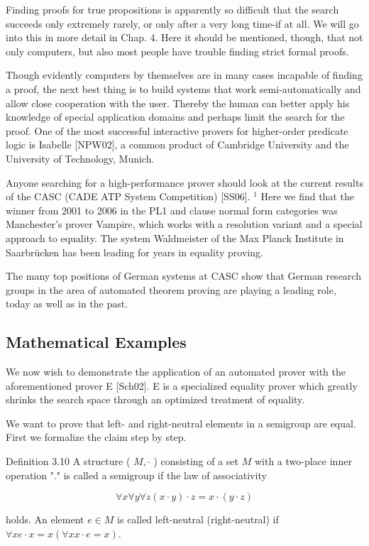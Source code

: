 \documentclass[10pt]{article}
\begin{document}
Finding proofs for true propositions is apparently so difficult that the search succeeds only extremely rarely, or only after a very long time-if at all. We will go into this in more detail in Chap. 4. Here it should be mentioned, though, that not only computers, but also most people have trouble finding strict formal proofs.

Though evidently computers by themselves are in many cases incapable of finding a proof, the next best thing is to build systems that work semi-automatically and allow close cooperation with the user. Thereby the human can better apply his knowledge of special application domains and perhaps limit the search for the proof. One of the most successful interactive provers for higher-order predicate logic is Isabelle [NPW02], a common product of Cambridge University and the University of Technology, Munich.

Anyone searching for a high-performance prover should look at the current results of the CASC (CADE ATP System Competition) [SS06]. ${ }^{1}$ Here we find that the winner from 2001 to 2006 in the PL1 and clause normal form categories was Manchester's prover Vampire, which works with a resolution variant and a special approach to equality. The system Waldmeister of the Max Planck Institute in Saarbrücken has been leading for years in equality proving.

The many top positions of German systems at CASC show that German research groups in the area of automated theorem proving are playing a leading role, today as well as in the past.

\subsection*{Mathematical Examples}
We now wish to demonstrate the application of an automated prover with the aforementioned prover E [Sch02]. E is a specialized equality prover which greatly shrinks the search space through an optimized treatment of equality.

We want to prove that left- and right-neutral elements in a semigroup are equal. First we formalize the claim step by step.

Definition 3.10 A structure ( $M, \cdot$ ) consisting of a set $M$ with a two-place inner operation "." is called a semigroup if the law of associativity

$$
\forall x \forall y \forall z(x \cdot y) \cdot z=x \cdot(y \cdot z)
$$

holds. An element $e \in M$ is called left-neutral (right-neutral) if $\forall x e \cdot x=x(\forall x x \cdot e=x)$.
\end{document}
